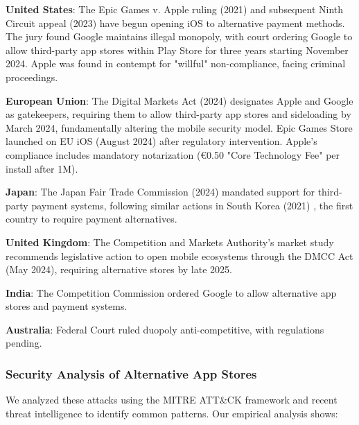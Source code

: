 \documentclass[11pt,a4paper]{article}
\begin{document}
\textbf{United States}: The Epic Games v. Apple ruling (2021) \cite{epic2021ruling} and subsequent Ninth Circuit appeal (2023) \cite{epic2024appeal} have begun opening iOS to alternative payment methods. The jury found Google maintains illegal monopoly, with court ordering Google to allow third-party app stores within Play Store for three years starting November 2024. Apple was found in contempt for "willful" non-compliance, facing criminal proceedings.

\textbf{European Union}: The Digital Markets Act (2024) \cite{eu2024dma} designates Apple and Google as gatekeepers, requiring them to allow third-party app stores and sideloading by March 2024, fundamentally altering the mobile security model. Epic Games Store launched on EU iOS (August 2024) after regulatory intervention. Apple's compliance includes mandatory notarization (€0.50 "Core Technology Fee" per install after 1M).

\textbf{Japan}: The Japan Fair Trade Commission (2024) \cite{japan2024appstore} mandated support for third-party payment systems, following similar actions in South Korea (2021) \cite{korea2021appstore}, the first country to require payment alternatives.

\textbf{United Kingdom}: The Competition and Markets Authority's market study \cite{uk2024cma} recommends legislative action to open mobile ecosystems through the DMCC Act (May 2024), requiring alternative stores by late 2025.

\textbf{India}: The Competition Commission \cite{india2024antitrust} ordered Google to allow alternative app stores and payment systems.

\textbf{Australia}: Federal Court ruled duopoly anti-competitive, with regulations pending.

\subsubsection{Security Analysis of Alternative App Stores}

We analyzed these attacks using the MITRE ATT\&CK framework and recent threat intelligence \cite{forrester2024appsec} to identify common patterns. Our empirical analysis shows:
\end{document}
